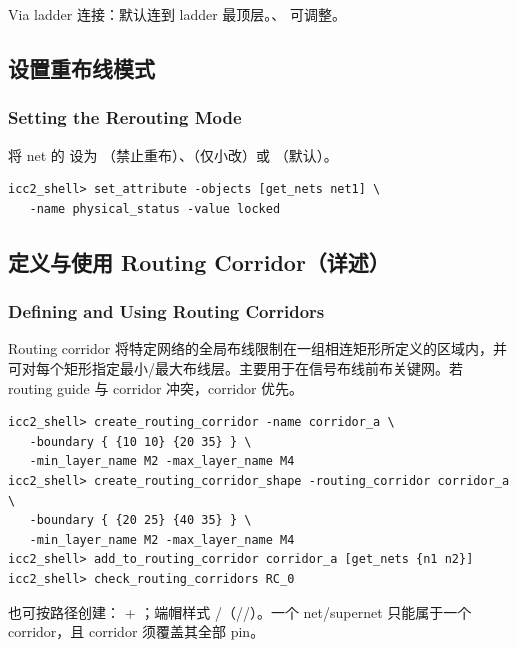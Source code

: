 Via ladder 连接：默认连到 ladder 最顶层。、 可调整。

\subsection{设置重布线模式}
\subsubsection*{Setting the Rerouting Mode}

将 net 的  设为 （禁止重布）、（仅小改）或 （默认）。

\begin{lstlisting}
icc2_shell> set_attribute -objects [get_nets net1] \
   -name physical_status -value locked
\end{lstlisting}


\subsection{定义与使用 Routing Corridor（详述）}
\subsubsection*{Defining and Using Routing Corridors}

Routing corridor 将特定网络的全局布线限制在一组相连矩形所定义的区域内，并可对每个矩形指定最小/最大布线层。主要用于在信号布线前布关键网。若 routing guide 与 corridor 冲突，corridor 优先。

\begin{lstlisting}
icc2_shell> create_routing_corridor -name corridor_a \
   -boundary { {10 10} {20 35} } \
   -min_layer_name M2 -max_layer_name M4
icc2_shell> create_routing_corridor_shape -routing_corridor corridor_a \
   -boundary { {20 25} {40 35} } \
   -min_layer_name M2 -max_layer_name M4
icc2_shell> add_to_routing_corridor corridor_a [get_nets {n1 n2}]
icc2_shell> check_routing_corridors RC_0
\end{lstlisting}

也可按路径创建：\opt{-path} + \opt{-width}；端帽样式 /（//）。一个 net/supernet 只能属于一个 corridor，且 corridor 须覆盖其全部 pin。


